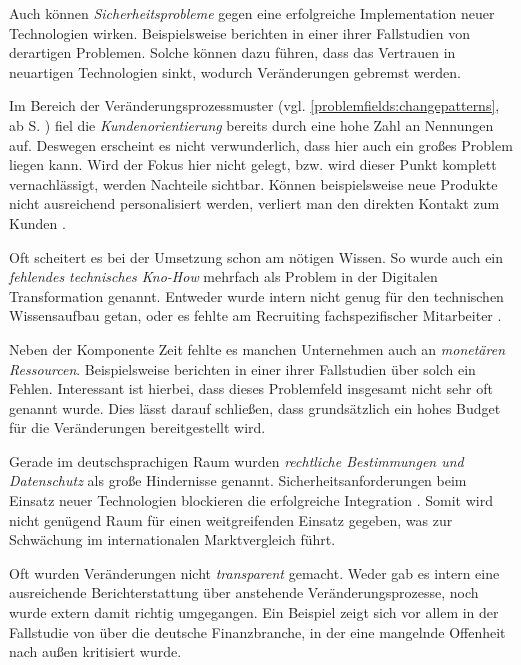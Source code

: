Auch können \textit{Sicherheitsprobleme} gegen eine erfolgreiche Implementation neuer Technologien wirken. Beispielsweise berichten  in einer ihrer Fallstudien von derartigen Problemen. Solche können dazu führen, dass das Vertrauen in neuartigen Technologien sinkt, wodurch Veränderungen gebremst werden.

Im Bereich der Veränderungsprozessmuster (vgl. \ref{problemfields:changepatterns}, ab S. \pageref{problemfields:changepatterns}) fiel die \textit{Kundenorientierung} bereits durch eine hohe Zahl an Nennungen auf. Deswegen erscheint es nicht verwunderlich, dass hier auch ein großes Problem liegen kann. Wird der Fokus hier nicht gelegt, bzw. wird dieser Punkt komplett vernachlässigt, werden Nachteile sichtbar. Können beispielsweise neue Produkte nicht ausreichend personalisiert werden, verliert man den direkten Kontakt zum Kunden \cite[S. 20]{kremins_2018_2018}.

Oft scheitert es bei der Umsetzung schon am nötigen Wissen. So wurde auch ein \textit{fehlendes technisches Kno-How} mehrfach als Problem in der Digitalen Transformation genannt. Entweder wurde intern nicht genug für den technischen Wissensaufbau getan, oder es fehlte am Recruiting fachspezifischer Mitarbeiter \cite[S. 37]{kawohl_digitale_2016}.

Neben der Komponente Zeit fehlte es  manchen Unternehmen auch an \textit{monetären Ressourcen}. Beispielsweise berichten  in einer ihrer Fallstudien über solch ein Fehlen. Interessant ist hierbei, dass dieses Problemfeld insgesamt nicht sehr oft genannt wurde. Dies lässt darauf schließen, dass grundsätzlich ein hohes Budget für die Veränderungen bereitgestellt wird.

Gerade im deutschsprachigen Raum wurden \textit{rechtliche Bestimmungen und Datenschutz} als große Hindernisse genannt. Sicherheitsanforderungen beim Einsatz neuer Technologien blockieren die erfolgreiche Integration \cite[S. 7]{depiereux_studie_2018}. Somit wird nicht genügend Raum für einen weitgreifenden Einsatz gegeben, was zur Schwächung im internationalen Marktvergleich führt.

Oft wurden Veränderungen nicht \textit{transparent} gemacht. Weder gab es intern eine ausreichende Berichterstattung über anstehende Veränderungsprozesse, noch wurde extern damit richtig umgegangen. Ein Beispiel zeigt sich vor allem in der Fallstudie von  über die deutsche Finanzbranche, in der eine mangelnde Offenheit nach außen kritisiert wurde.


